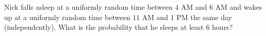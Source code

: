 Nick falls asleep at a uniformly random time between $4$ AM and $6$ AM and wakes up at a uniformly random time between $11$ AM and $1$ PM the same day (independently). What is the probability that he sleeps at least $6$ hours?
